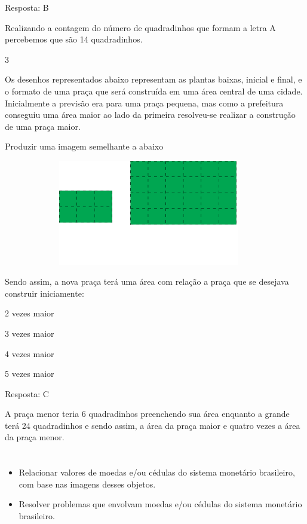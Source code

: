 Resposta: B

Realizando a contagem do número de quadradinhos que formam a letra A
percebemos que são 14 quadradinhos.

\num{3}

Os desenhos representados abaixo representam as plantas baixas, inicial
e final, e o formato de uma praça que será construída em uma área
central de uma cidade. Inicialmente a previsão era para uma praça
pequena, mas como a prefeitura conseguiu uma área maior ao lado da
primeira resolveu-se realizar a construção de uma praça maior.

Produzir uma imagem semelhante a abaixo

\includegraphics[width=5.00877in,height=1.80849in]{media/image63.png}

Sendo assim, a nova praça terá uma área com relação a praça que se
desejava construir iniciamente:

\begin{escolha}
\item
  2 vezes maior
\item
  3 vezes maior
\item
  4 vezes maior
\item
  5 vezes maior
\end{escolha}

Resposta: C

A praça menor teria 6 quadradinhos preenchendo sua área enquanto a
grande terá 24 quadradinhos e sendo assim, a área da praça maior e
quatro vezes a área da praça menor.

\chapter{}



\begin{itemize}
    \item Relacionar valores de moedas e/ou cédulas do sistema monetário
brasileiro, com base nas imagens desses objetos.

    \item Resolver problemas que envolvam moedas e/ou cédulas do sistema
monetário brasileiro.
\end{itemize}

